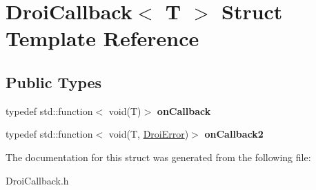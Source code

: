\hypertarget{struct_droi_callback}{}\section{Droi\+Callback$<$ T $>$ Struct Template Reference}
\label{struct_droi_callback}
\subsection*{Public Types}
\begin{DoxyCompactItemize}
\item 
\mbox{\label{struct_droi_callback_ac1866253e825381e87b8468310e770d2}} 
typedef std\+::function$<$ void(T)$>$ {\bfseries on\+Callback}
\item 
\mbox{\label{struct_droi_callback_a1c01f631ccf5284a6a2f6ae2d820d0b7}} 
typedef std\+::function$<$ void(T, \hyperlink{class_droi_error}{Droi\+Error})$>$ {\bfseries on\+Callback2}
\end{DoxyCompactItemize}


The documentation for this struct was generated from the following file\+:\begin{DoxyCompactItemize}
\item 
Droi\+Callback.\+h\end{DoxyCompactItemize}
